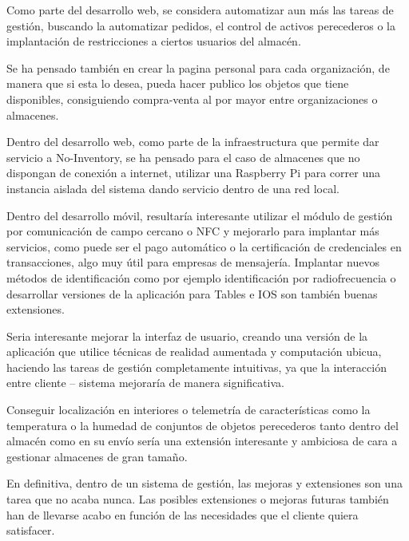 \documentclass[a4paper,11pt]{book}
\begin{document}
Como parte del desarrollo web, se considera automatizar aun más las tareas de gestión, buscando la automatizar pedidos, el control de activos perecederos o la implantación de restricciones a ciertos usuarios del almacén.

Se ha pensado también en crear la pagina personal para cada organización, de manera que si esta lo desea, pueda hacer publico los objetos que tiene disponibles, consiguiendo compra-venta al por mayor entre organizaciones o almacenes. 
	
Dentro del desarrollo web, como parte de la infraestructura que permite dar servicio a No-Inventory, se ha pensado para el caso de almacenes que no dispongan de conexión a internet, utilizar una Raspberry Pi para correr una instancia aislada del sistema dando servicio dentro de una red local. 


Dentro del desarrollo móvil, resultaría interesante utilizar el módulo de gestión por comunicación de campo cercano o NFC y mejorarlo para implantar más servicios, como puede ser el pago automático o la certificación de credenciales en transacciones, algo  muy útil para empresas de mensajería. Implantar nuevos métodos de identificación como por ejemplo identificación por radiofrecuencia  o desarrollar versiones de la aplicación para Tables e IOS son también buenas extensiones.  

Seria interesante mejorar la interfaz de usuario, creando una versión de la aplicación que utilice técnicas de realidad aumentada y computación ubicua,  haciendo las tareas de gestión completamente intuitivas, ya que la interacción entre cliente – sistema mejoraría de manera significativa. 

Conseguir localización en interiores  o telemetría de características como la temperatura o la humedad de conjuntos de objetos perecederos tanto dentro del almacén como en su envío sería una extensión interesante y ambiciosa de cara a gestionar almacenes de gran tamaño. 

En definitiva, dentro de un sistema de gestión, las mejoras y extensiones son una tarea que no acaba nunca. Las posibles extensiones o mejoras futuras también han de llevarse acabo en función de las necesidades que el cliente quiera satisfacer. 
\end{document}
